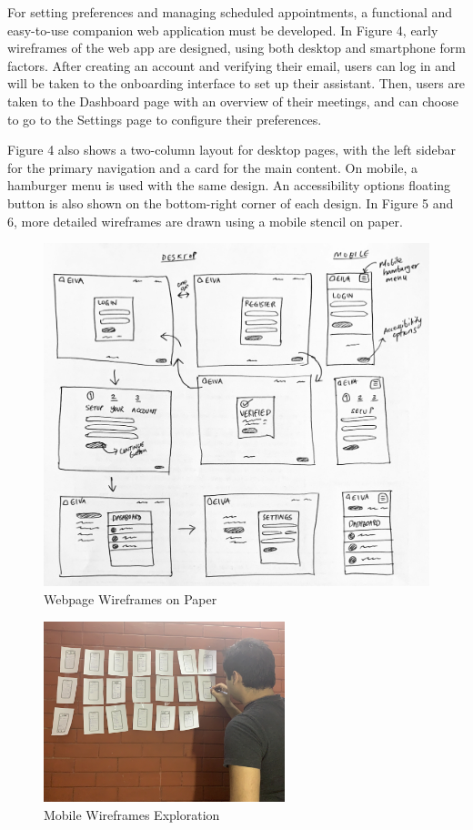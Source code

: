 \documentclass{article}
\begin{document}
For setting preferences and managing scheduled appointments, a functional and easy-to-use companion web application must be developed. In Figure 4, early wireframes of the web app are designed, using both desktop and smartphone form factors. After creating an account and verifying their email, users can log in and will be taken to the onboarding interface to set up their assistant. Then, users are taken to the Dashboard page with an overview of their meetings, and can choose to go to the Settings page to configure their preferences.

Figure 4 also shows a two-column layout for desktop pages, with the left sidebar for the primary navigation and a card for the main content. On mobile, a hamburger menu is used with the same design. An accessibility options floating button is also shown on the bottom-right corner of each design. In Figure 5 and 6, more detailed wireframes are drawn using a mobile stencil on paper.

\begin{figure}
	\includegraphics[width=\textwidth]{drawing-ui.jpg}
	\caption{Webpage Wireframes on Paper}
\end{figure}

\begin{figure}
	\center
	\includegraphics[width=7cm]{ideation-wall.jpg}
	\caption{Mobile Wireframes Exploration}
\end{figure}
 
\end{document}
